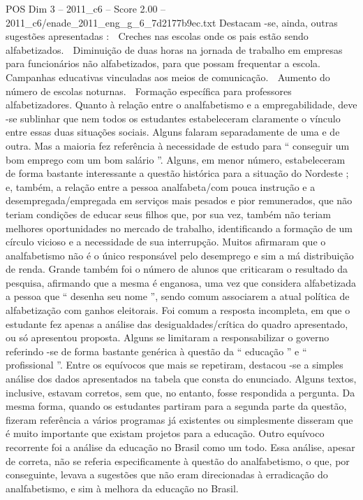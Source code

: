 \begin{textsample}{POS Dim 3 – 2011\_c6 – Score 2.00 – 2011\_c6/enade\_2011\_eng\_g\_6\_7d2177b9ec.txt}
Destacam -se, ainda, outras sugestões apresentadas :  Creches nas escolas onde os pais estão sendo alfabetizados.  Diminuição de duas horas na jornada de trabalho em empresas para funcionários não alfabetizados, para que possam frequentar a escola.  Campanhas educativas vinculadas aos meios de comunicação.  Aumento do número de escolas noturnas.  Formação específica para professores alfabetizadores.
Quanto à relação entre o analfabetismo e a empregabilidade, deve -se sublinhar que nem todos os estudantes estabeleceram claramente o vínculo entre essas duas situações sociais.
Alguns falaram separadamente de uma e de outra.
Mas a maioria fez referência à necessidade de estudo para “ conseguir um bom emprego com um bom salário ”.
Alguns, em menor número, estabeleceram de forma bastante interessante a questão histórica para a situação do Nordeste ; e, também, a relação entre a pessoa analfabeta/com pouca instrução e a desempregada/empregada em serviços mais pesados e pior remunerados, que não teriam condições de educar seus filhos que, por sua vez, também não teriam melhores oportunidades no mercado de trabalho, identificando a formação de um círculo vicioso e a necessidade de sua interrupção.
Muitos afirmaram que o analfabetismo não é o único responsável pelo desemprego e sim a má distribuição de renda.
Grande também foi o número de alunos que criticaram o resultado da pesquisa, afirmando que a mesma é enganosa, uma vez que considera alfabetizada a pessoa que “ desenha seu nome ”, sendo comum associarem a atual política de alfabetização com ganhos eleitorais.
Foi comum a resposta incompleta, em que o estudante fez apenas a análise das desigualdades/crítica do quadro apresentado, ou só apresentou proposta.
Alguns se limitaram a responsabilizar o governo referindo -se de forma bastante genérica à questão da “ educação ” e “ profissional ”.
Entre os equívocos que mais se repetiram, destacou -se a simples análise dos dados apresentados na tabela que consta do enunciado.
Alguns textos, inclusive, estavam corretos, sem que, no entanto, fosse respondida a pergunta.
Da mesma forma, quando os estudantes partiram para a segunda parte da questão, fizeram referência a vários programas já existentes ou simplesmente disseram que é muito importante que existam projetos para a educação.
Outro equívoco recorrente foi a análise da educação no Brasil como um todo.
Essa análise, apesar de correta, não se referia especificamente à questão do analfabetismo, o que, por conseguinte, levava a sugestões que não eram direcionadas à erradicação do analfabetismo, e sim à melhora da educação no Brasil.

\end{textsample}
